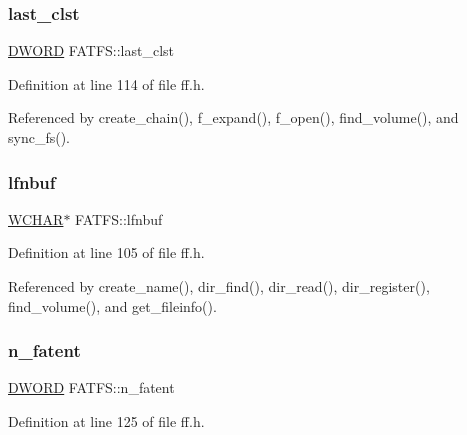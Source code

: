 \mbox{\label{structFATFS_ac26e848817569fedc15a9a4e49ddedd1}} 
\subsubsection{\texorpdfstring{last\+\_\+clst}{last\_clst}}
{\footnotesize\ttfamily \hyperlink{integer_8h_ad342ac907eb044443153a22f964bf0af}{D\+W\+O\+RD} F\+A\+T\+F\+S\+::last\+\_\+clst}



Definition at line 114 of file ff.\+h.



Referenced by create\+\_\+chain(), f\+\_\+expand(), f\+\_\+open(), find\+\_\+volume(), and sync\+\_\+fs().

\mbox{\label{structFATFS_ad1999aa771ae428c3abe14dbe585e981}} 
\subsubsection{\texorpdfstring{lfnbuf}{lfnbuf}}
{\footnotesize\ttfamily \hyperlink{integer_8h_a570001c92f314285ad3e7139d8c58cf7}{W\+C\+H\+AR}$\ast$ F\+A\+T\+F\+S\+::lfnbuf}



Definition at line 105 of file ff.\+h.



Referenced by create\+\_\+name(), dir\+\_\+find(), dir\+\_\+read(), dir\+\_\+register(), find\+\_\+volume(), and get\+\_\+fileinfo().

\mbox{\label{structFATFS_a8da50eeba6469bc20d60ca0cf9a1307c}} 
\subsubsection{\texorpdfstring{n\+\_\+fatent}{n\_fatent}}
{\footnotesize\ttfamily \hyperlink{integer_8h_ad342ac907eb044443153a22f964bf0af}{D\+W\+O\+RD} F\+A\+T\+F\+S\+::n\+\_\+fatent}



Definition at line 125 of file ff.\+h.



